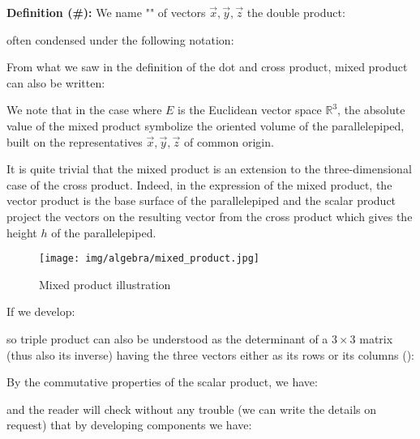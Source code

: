 	\textbf{Definition (\#\mydef):} We name "" of vectors $\vec{x},\vec{y},\vec{z}$ the double product:
	 
	 often condensed under the following notation:
	  
	 From what we saw in the definition of the dot and cross product, mixed product can also be written:
	 
	 We note that in the case where $E$ is the Euclidean vector space $\mathbb{R}^3$, the absolute value of the mixed product symbolize the oriented volume of the parallelepiped, built on the representatives $\vec{x},\vec{y},\vec{z}$ of common origin.
	 
	It is quite trivial that the mixed product is an extension to the three-dimensional case of the cross product. Indeed, in the expression of the mixed product, the vector product is the base surface of the parallelepiped and the scalar product project the vectors on the resulting vector from the cross product which gives the height $h$ of the parallelepiped.
	
	\begin{figure}[H]
		\centering
		\texttt{[image: img/algebra/mixed\_product.jpg]}
		\caption{Mixed product illustration}		
	\end{figure}
			
	If we develop:
	
	so triple product can also be understood as the determinant of a $3\times 3$ matrix (thus also its inverse) having the three vectors either as its rows or its columns ():
	
	 By the commutative properties of the scalar product, we have:
	 
	and the reader will check without any trouble (we can write the details on request) that by developing components we have:
	

